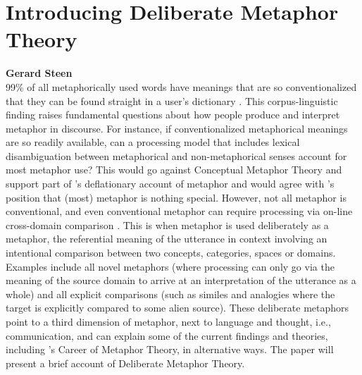 \documentclass[10pt,letterpaper]{article}
\begin{document}
\section{Introducing Deliberate Metaphor Theory}
\large \textbf{Gerard Steen}\\
99\% of all metaphorically used words have meanings that are so conventionalized that they can be found straight in a user's dictionary \cite{steen2010method}. This corpus-linguistic finding raises fundamental questions about how people produce and interpret metaphor in discourse. For instance, if conventionalized metaphorical meanings are so readily available, can a processing model that includes lexical disambiguation between metaphorical and non-metaphorical senses account for most metaphor use? This would go against Conceptual Metaphor Theory \cite{lakoff2008metaphors} and support part of 's deflationary account of metaphor and would agree with 's position that (most) metaphor is nothing special. However, not all metaphor is conventional, and even conventional metaphor can require processing via on-line cross-domain comparison \cite{steen2008paradox, steen2015developing}. This is when metaphor is used deliberately as a metaphor, the referential meaning of the utterance in context involving an intentional comparison between two concepts, categories, spaces or domains. Examples include all novel metaphors (where processing can only go via the meaning of the source domain to arrive at an interpretation of the utterance as a whole) and all explicit comparisons (such as similes and analogies where the target is explicitly compared to some alien source). These deliberate metaphors point to a third dimension of metaphor, next to language and thought, i.e., communication, and can explain some of the current findings and theories, including 's  Career of Metaphor Theory, in alternative ways. The paper will present a brief account of Deliberate Metaphor Theory.
\end{document}

